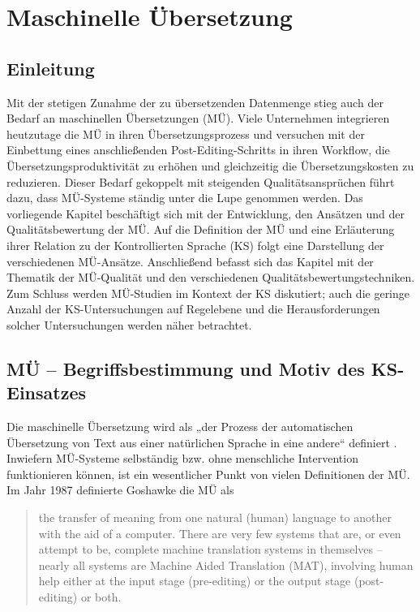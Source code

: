 \chapter{\label{ch:3}Maschinelle Übersetzung}

\section{\label{sec:3.0}Einleitung}

Mit der stetigen Zunahme der zu übersetzenden Datenmenge stieg auch der Bedarf an maschinellen Übersetzungen (MÜ). Viele Unternehmen integrieren heutzutage die MÜ in ihren Übersetzungsprozess und versuchen mit der Einbettung eines anschließenden Post-Editing-Schritts in ihren Workflow, die Übersetzungsproduktivität zu erhöhen und gleichzeitig die Übersetzungskosten zu reduzieren. Dieser Bedarf gekoppelt mit steigenden Qualitätsansprüchen führt dazu, dass MÜ-Systeme ständig unter die Lupe genommen werden. Das vorliegende Kapitel beschäftigt sich mit der Entwicklung, den Ansätzen und der Qualitätsbewertung der MÜ. Auf die Definition der MÜ und eine Erläuterung ihrer Relation zu der Kontrollierten Sprache (KS) folgt eine Darstellung der verschiedenen MÜ-Ansätze. Anschließend befasst sich das Kapitel mit der Thematik der MÜ-Qualität und den verschiedenen Qualitätsbewertungstechniken. Zum Schluss werden MÜ-Studien im Kontext der KS diskutiert; auch die geringe Anzahl der KS-Untersuchungen auf Regelebene und die Herausforderungen solcher Untersuchungen werden näher betrachtet.

\section{\label{sec:3.1}MÜ – Begriffsbestimmung und Motiv des KS-Einsatzes}

Die maschinelle Übersetzung wird als „der Prozess der automatischen Übersetzung von Text aus einer natürlichen Sprache in eine andere“ definiert \citep{DorrEtAl1999}. Inwiefern MÜ-Systeme selbständig bzw. ohne menschliche Intervention funktionieren können, ist ein wesentlicher Punkt von vielen Definitionen der MÜ. Im Jahr 1987 definierte Goshawke die MÜ als

\begin{quote}
the transfer of meaning from one natural (human) language to another with the aid of a computer. There are very few systems that are, or even attempt to be, complete machine translation systems in themselves -- nearly all systems are Machine Aided Translation (MAT), involving human help either at the input stage (pre-editing) or the output stage (post-editing) or both. \citep[6]{Goshawke1987}
\end{quote}

